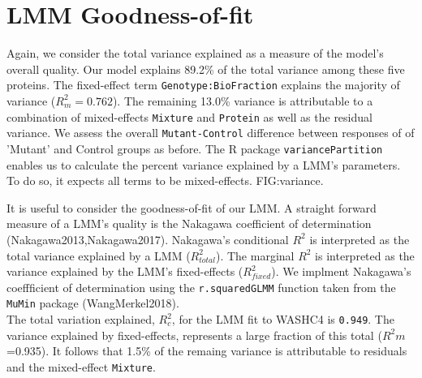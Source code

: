 \documentclass[11pt]{elife}\usepackage[]{graphicx}\usepackage[]{color}
\begin{document}
\section{LMM Goodness-of-fit}

Again, we consider the total variance explained as a measure of the model's
overall quality. Our model explains 89.2\% of the total variance among these
five proteins. The fixed-effect term \texttt{Genotype:BioFraction} explains the
majority of variance ($R^2_m=0.762$). The remaining 13.0\% variance is
attributable to a combination of mixed-effects \texttt{Mixture} and
\texttt{Protein} as well as the residual variance. We assess the overall
\texttt{Mutant-Control} difference between responses of of 'Mutant' and Control
groups as before. The R package \texttt{variancePartition} enables us to
calculate the percent variance explained by a LMM's parameters. To do so, it
expects all terms to be mixed-effects. FIG:variance.

It is useful to consider the goodness-of-fit of our LMM. A straight forward
measure of a LMM's quality is the Nakagawa coefficient of 
determination (Nakagawa2013,Nakagawa2017). Nakagawa's conditional $R^2$ is 
interpreted as the total variance explained by a LMM ($R^2_{total}$).
The marginal $R^2$ is interpreted as the variance explained by the LMM's 
fixed-effects ($R^2_{fixed}$). We implment Nakagawa's coeffficient of 
determination using the \texttt{r.squaredGLMM} function taken from the 
\texttt{MuMin} package (WangMerkel2018).\\


%
%
%


The total variation explained, $R^2_{c}$, for the LMM fit to WASHC4 is 
\texttt{0.949}. The variance explained by fixed-effects, represents a large
fraction of this total ($R^2{m}$=0.935). It follows that 1.5\% of the remaing
variance is attributable to residuals and the mixed-effect \texttt{Mixture}.\\


%
%
%
%
\end{document}
